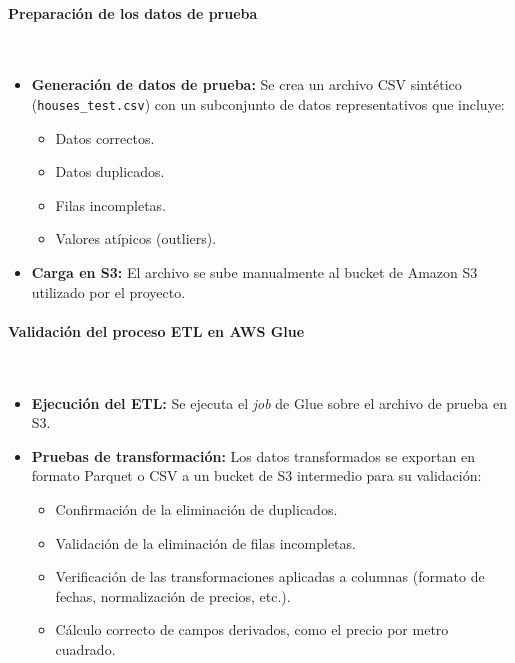 \documentclass{article}
\begin{document}
\paragraph{Preparación de los datos de prueba} \mbox{} \\
\begin{itemize}
    \item \textbf{Generación de datos de prueba:} Se crea un archivo CSV sintético (\texttt{houses\_test.csv}) con un subconjunto de datos representativos que incluye:
    \begin{itemize}
        \item Datos correctos.
        \item Datos duplicados.
        \item Filas incompletas.
        \item Valores atípicos (outliers).
    \end{itemize}
    \item \textbf{Carga en S3:} El archivo se sube manualmente al bucket de Amazon S3 utilizado por el proyecto.
\end{itemize}

\paragraph{Validación del proceso ETL en AWS Glue} \mbox{} \\
\begin{itemize}
    \item \textbf{Ejecución del ETL:} Se ejecuta el \textit{job} de Glue sobre el archivo de prueba en S3.
    \item \textbf{Pruebas de transformación:} Los datos transformados se exportan en formato Parquet o CSV a un bucket de S3 intermedio para su validación:
    \begin{itemize}
        \item Confirmación de la eliminación de duplicados.
        \item Validación de la eliminación de filas incompletas.
        \item Verificación de las transformaciones aplicadas a columnas (formato de fechas, normalización de precios, etc.).
        \item Cálculo correcto de campos derivados, como el precio por metro cuadrado.
    \end{itemize}
\end{itemize}
\end{document}
